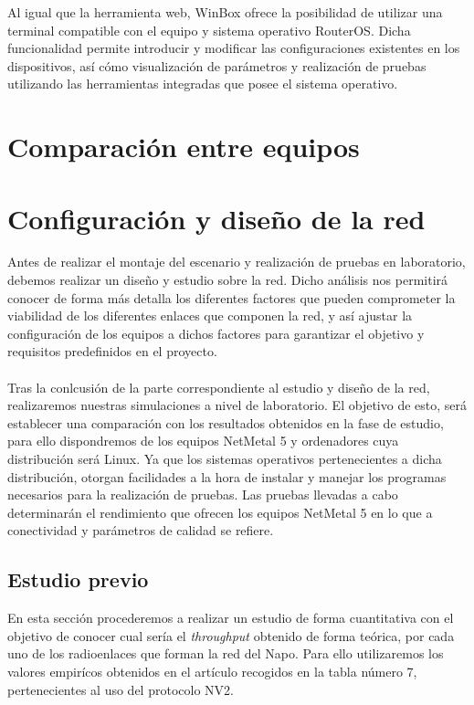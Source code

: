 		Al igual que la herramienta web, WinBox ofrece la posibilidad de utilizar una terminal compatible con el equipo y sistema operativo RouterOS. Dicha funcionalidad permite introducir y modificar las configuraciones existentes en los dispositivos, así cómo visualización de parámetros y realización de pruebas utilizando las herramientas integradas que posee el sistema operativo.
		
\section{Comparación entre equipos}	

		
\section{Configuración y diseño de la red}
Antes de realizar el montaje del escenario y realización de pruebas en laboratorio, debemos realizar un diseño y estudio sobre la red. Dicho análisis nos permitirá conocer de forma más detalla los diferentes factores que pueden comprometer la viabilidad de los diferentes enlaces que componen la red, y así ajustar la configuración de los equipos a dichos factores para garantizar el objetivo y requisitos predefinidos en el proyecto.\\\\

Tras la conlcusión de la parte correspondiente al estudio y diseño de la red, realizaremos nuestras simulaciones a nivel de laboratorio. El objetivo de esto, será establecer una comparación con los resultados obtenidos en la fase de estudio, para ello dispondremos de los equipos NetMetal 5 y ordenadores cuya distribución será Linux. Ya que los sistemas operativos pertenecientes a dicha distribución, otorgan facilidades a la hora de instalar y manejar los programas necesarios para la realización de pruebas. Las pruebas llevadas a cabo determinarán el rendimiento que ofrecen los equipos NetMetal 5 en lo que a conectividad y parámetros de calidad se refiere.

\subsection{Estudio previo} 
	En esta sección procederemos a realizar un estudio de forma cuantitativa con el objetivo de conocer cual sería el \textit{throughput} obtenido de forma teórica, por cada uno de los radioenlaces que forman la red del Napo. Para ello utilizaremos los valores empirícos obtenidos en el artículo \cite{simo2014assessing} recogidos en la tabla número 7,  pertenecientes al uso del protocolo NV2.\\\\
	
